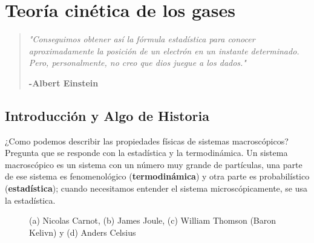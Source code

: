 \documentclass[11pt,fleqn]{book}
\begin{document}


\pagestyle{empty} %
\renewcommand\contentsname{Contenido}
\tableofcontents %


\pagestyle{fancy} %


\renewcommand{\chaptername}{}
\chapter{Teoría cinética de los gases}

\begin{quote}
\emph{"Conseguimos obtener así la fórmula estadística para conocer aproximadamente la posición de un electrón en un instante determinado. Pero, personalmente, no creo que dios juegue a los dados."}
\begin{flushright}
\textbf{-Albert Einstein}
\end{flushright}
\headrule
\end{quote}

\section{Introducción y Algo de Historia}

¿Como podemos describir las propiedades físicas de sistemas macroscópicos? Pregunta que se responde con la estadística y la termodinámica. Un sistema macroscópico es un sistema con un número muy grande de partículas, una parte de ese sistema es fenomenológico (\textbf{termodinámica}) y otra parte es probabilístico (\textbf{estadística}); cuando necesitamos entender el sistema microscópicamente, se usa la estadística.

\begin{figure}[H]
    \centering
    \caption{(a) Nicolas Carnot, (b) James Joule, (c) William Thomson (Baron Kelivn) y (d) Anders Celsius}
\end{figure}
\end{document}
